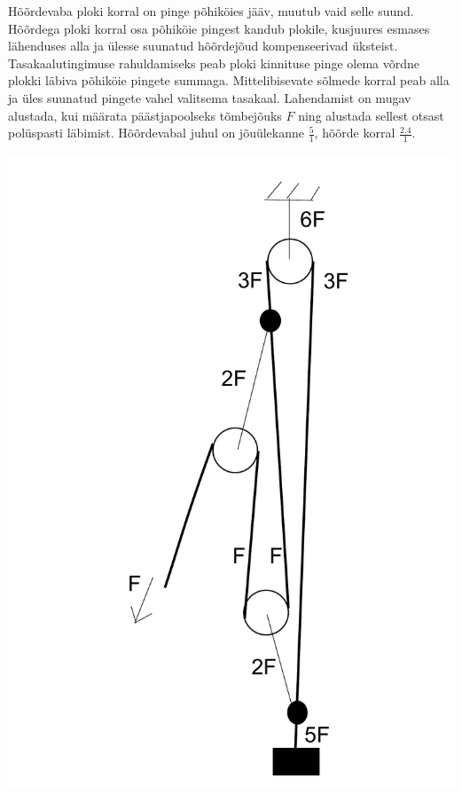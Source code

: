 \documentclass[11pt, twoside]{article}
\begin{document}
{{\ifSolution
Hõõrdevaba ploki korral on pinge põhiköies jääv, muutub vaid selle suund. Hõõrdega ploki korral osa põhiköie pingest kandub plokile, kusjuures esmases lähenduses alla ja ülesse suunatud hõõrdejõud kompenseerivad üksteist. Tasakaalutingimuse rahuldamiseks peab ploki kinnituse pinge olema võrdne plokki läbiva põhiköie pingete summaga. Mittelibisevate sõlmede korral peab alla ja üles suunatud pingete vahel valitsema tasakaal. Lahendamist on mugav alustada, kui määrata päästjapoolseks tõmbejõuks $F$ ning alustada sellest otsast polüspasti läbimist. Hõõrdevabal juhul on jõuülekanne $\frac{5}{1}$, hõõrde korral $\frac{\num{2,4}}{1}$.

\begin{center}
\includegraphics[scale=0.25]{2014-v3g-06-PolyspastL1}

\end{center}}}
\end{document}
